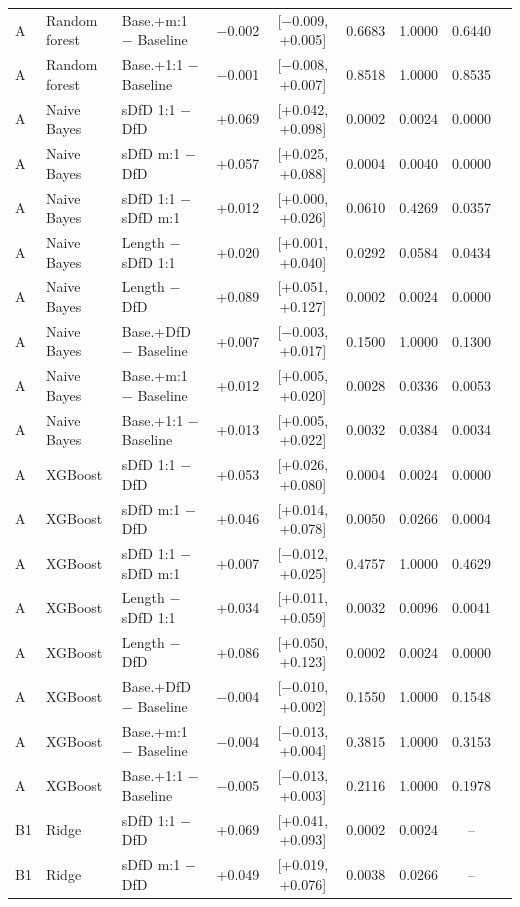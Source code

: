 \begin{longtable}{lllcccccc}
A & Random forest & Base.+m:1 $-$ Baseline & $-$0.002 & [$-$0.009, +0.005] & 0.6683 & 1.0000 & 0.6440 \\
A & Random forest & Base.+1:1 $-$ Baseline & $-$0.001 & [$-$0.008, +0.007] & 0.8518 & 1.0000 & 0.8535 \\
A & Naive Bayes & sDfD 1:1 $-$ DfD & +0.069 & [+0.042, +0.098] & 0.0002 & 0.0024 & 0.0000 \\
A & Naive Bayes & sDfD m:1 $-$ DfD & +0.057 & [+0.025, +0.088] & 0.0004 & 0.0040 & 0.0000 \\
A & Naive Bayes & sDfD 1:1 $-$ sDfD m:1 & +0.012 & [+0.000, +0.026] & 0.0610 & 0.4269 & 0.0357 \\
A & Naive Bayes & Length $-$ sDfD 1:1 & +0.020 & [+0.001, +0.040] & 0.0292 & 0.0584 & 0.0434 \\
A & Naive Bayes & Length $-$ DfD & +0.089 & [+0.051, +0.127] & 0.0002 & 0.0024 & 0.0000 \\
A & Naive Bayes & Base.+DfD $-$ Baseline & +0.007 & [$-$0.003, +0.017] & 0.1500 & 1.0000 & 0.1300 \\
A & Naive Bayes & Base.+m:1 $-$ Baseline & +0.012 & [+0.005, +0.020] & 0.0028 & 0.0336 & 0.0053 \\
A & Naive Bayes & Base.+1:1 $-$ Baseline & +0.013 & [+0.005, +0.022] & 0.0032 & 0.0384 & 0.0034 \\
A & XGBoost & sDfD 1:1 $-$ DfD & +0.053 & [+0.026, +0.080] & 0.0004 & 0.0024 & 0.0000 \\
A & XGBoost & sDfD m:1 $-$ DfD & +0.046 & [+0.014, +0.078] & 0.0050 & 0.0266 & 0.0004 \\
A & XGBoost & sDfD 1:1 $-$ sDfD m:1 & +0.007 & [$-$0.012, +0.025] & 0.4757 & 1.0000 & 0.4629 \\
A & XGBoost & Length $-$ sDfD 1:1 & +0.034 & [+0.011, +0.059] & 0.0032 & 0.0096 & 0.0041 \\
A & XGBoost & Length $-$ DfD & +0.086 & [+0.050, +0.123] & 0.0002 & 0.0024 & 0.0000 \\
A & XGBoost & Base.+DfD $-$ Baseline & $-$0.004 & [$-$0.010, +0.002] & 0.1550 & 1.0000 & 0.1548 \\
A & XGBoost & Base.+m:1 $-$ Baseline & $-$0.004 & [$-$0.013, +0.004] & 0.3815 & 1.0000 & 0.3153 \\
A & XGBoost & Base.+1:1 $-$ Baseline & $-$0.005 & [$-$0.013, +0.003] & 0.2116 & 1.0000 & 0.1978 \\
B1 & Ridge & sDfD 1:1 $-$ DfD & +0.069 & [+0.041, +0.093] & 0.0002 & 0.0024 & -- \\
B1 & Ridge & sDfD m:1 $-$ DfD & +0.049 & [+0.019, +0.076] & 0.0038 & 0.0266 & -- \\

\end{longtable}
